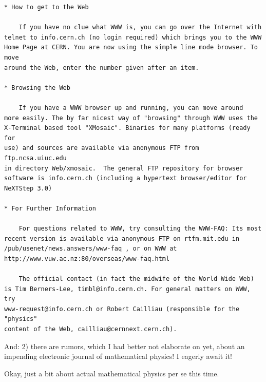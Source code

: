 \documentclass{article}
\begin{document}
\begin{verbatim}
* How to get to the Web

    If you have no clue what WWW is, you can go over the Internet with
telnet to info.cern.ch (no login required) which brings you to the WWW 
Home Page at CERN. You are now using the simple line mode browser. To move 
around the Web, enter the number given after an item. 

* Browsing the Web

    If you have a WWW browser up and running, you can move around
more easily. The by far nicest way of "browsing" through WWW uses the
X-Terminal based tool "XMosaic". Binaries for many platforms (ready for
use) and sources are available via anonymous FTP from ftp.ncsa.uiuc.edu
in directory Web/xmosaic.  The general FTP repository for browser
software is info.cern.ch (including a hypertext browser/editor for
NeXTStep 3.0)

* For Further Information

    For questions related to WWW, try consulting the WWW-FAQ: Its most 
recent version is available via anonymous FTP on rtfm.mit.edu in 
/pub/usenet/news.answers/www-faq , or on WWW at 
http://www.vuw.ac.nz:80/overseas/www-faq.html

    The official contact (in fact the midwife of the World Wide Web) 
is Tim Berners-Lee, timbl@info.cern.ch. For general matters on WWW, try 
www-request@info.cern.ch or Robert Cailliau (responsible for the "physics" 
content of the Web, cailliau@cernnext.cern.ch).
\end{verbatim}

And: 2) there are rumors, which I had better not elaborate on yet, about
an impending electronic journal of mathematical physics! I eagerly await
it!

Okay, just a bit about actual mathematical physics per se this time.
\end{document}
